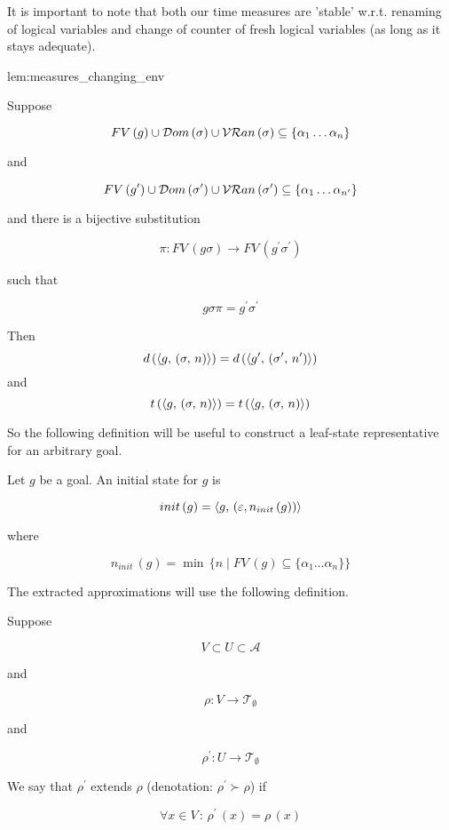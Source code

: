               
It is important to note that both our time measures are 'stable' w.r.t. renaming of logical variables and change of counter of fresh logical variables (as long as it stays adequate).

\begin{replemma}{lem:measures_changing_env}

  Suppose

  \[ FV\,(g) \cup \mathcal{D}om\,(\sigma) \cup \mathcal{VR}an\,(\sigma) \subseteq \{ \alpha_1\dots\alpha_n \} \]
  
  and

  \[ FV\,(g^\prime) \cup \mathcal{D}om\,(\sigma^\prime) \cup \mathcal{VR}an\,(\sigma^\prime) \subseteq \{ \alpha_1\dots \alpha_{n^\prime} \} \]

  and there is a bijective substitution

  \[\pi \colon FV\,(g \sigma) \to FV\,(g^\prime \sigma^\prime)\]

  such that

  \[ g \sigma \pi = g^\prime \sigma^\prime \]

  Then \[ d\,(\langle g ,\, (\sigma ,\, n) \rangle) = d\,(\langle g^\prime ,\, (\sigma^\prime ,\, n^\prime) \rangle) \] and \[ t\,(\langle g ,\, (\sigma ,\, n) \rangle) = t\,(\langle g ,\, (\sigma ,\, n) \rangle) \] 

\end{replemma}

So the following definition will be useful to construct a leaf-state representative for an arbitrary goal.

\begin{definition} Let $g$ be a goal. An initial state for $g$ is

  \[
   init\,(g)=\langle g ,\, (\varepsilon, n_{init}\,(g)) \rangle
  \]

  where
  
  \[ n_{init}\,(g) = \min\, \{ n \mid FV\,(g) \subseteq \{ \alpha_1\dots\alpha_n \} \} \]
\end{definition}
		
The extracted approximations will use the following definition.

\begin{definition}
  Suppose

  \[V \subset U \subset \mathcal{A}\]

  and

  \[\rho \colon V \to \mathcal{T}_{\emptyset}\]

  and

  \[\rho^\prime \colon U \to \mathcal{T}_{\emptyset}\]

  We say that $\rho^\prime$ extends $\rho$ (denotation: $ \rho^\prime \succ \rho$) if
  
\[ \forall x \in V \,:\, \rho^\prime\,(x) = \rho\,(x) \]
\end{definition}


